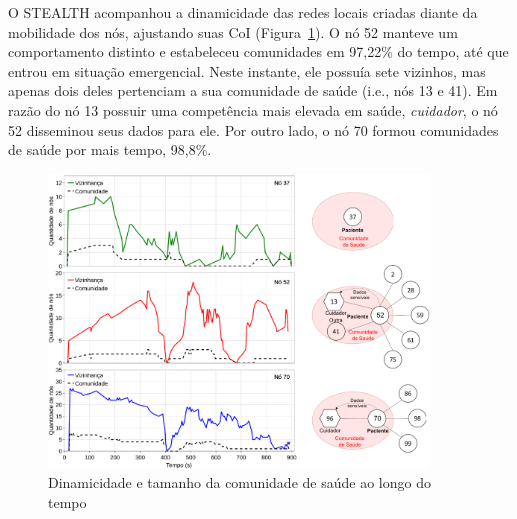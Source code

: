 \documentclass[12pt]{article}
\newcommand{\agn}[1]{\textcolor{auburn}{#1}}
\begin{document}
O \mbox{STEALTH} acompanhou a dinamicidade das redes locais criadas diante da mobilidade dos nós, ajustando suas CoI \agn{(Figura~\ref{fig:neighs_x_cois}).}
O nó 52 manteve um comportamento distinto  e estabeleceu comunidades em 97,22\% do tempo, até que entrou em situação emergencial. Neste instante,
ele possuía sete vizinhos, mas apenas dois deles pertenciam a sua comunidade de saúde (i.e., nós 13 e 41). Em razão do nó 13 possuir  uma competência mais elevada em saúde, \textit{cuidador}, o nó 52 disseminou seus dados para ele.
\agn{Por outro lado,}
o nó 70  formou comunidades de saúde por mais tempo, 98,8\%.

\begin{figure}[!htb]
\centering
\includegraphics[width=0.9\textwidth]{figures/neighs_cois_v2_890s_stack_3.pdf}
\vspace{-0.2cm}
\caption{Dinamicidade e tamanho da comunidade de saúde ao longo do tempo}
\label{fig:neighs_x_cois}
\end{figure}
\end{document}
